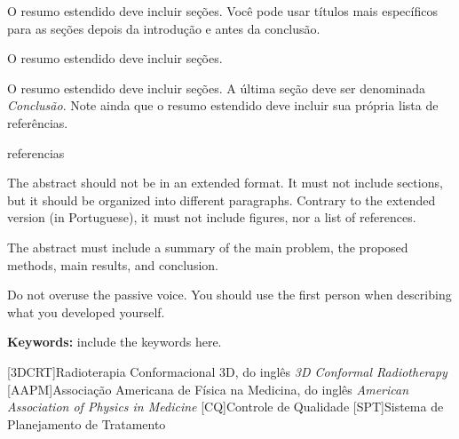 \documentclass[a4paper, 12pt]{ppgeb}
\begin{document}
O resumo estendido deve incluir seções. Você pode usar títulos mais específicos para as seções depois da introdução e antes da conclusão.

O resumo estendido deve incluir seções.

O resumo estendido deve incluir seções. A última seção deve ser denominada \emph{Conclusão}. Note ainda que o resumo estendido deve incluir sua própria lista de referências.

{\let\clearpage\relax
{referencias}{}
}
\acresetall %
\clearpage
\restoregeometry
\acresetall %
\vspace{24pt}

The abstract should not be in an extended format. It must not include sections, but it should be organized into different paragraphs. Contrary to the extended version (in Portuguese), it must not include figures, nor a list of references.

The abstract must include a summary of the main problem, the proposed methods, main results, and conclusion.

Do not overuse the passive voice. You should use the first person when describing what you developed yourself.

\vspace{14pt}

\noindent\textbf{Keywords: }include the keywords here.


\acresetall %

\indice

\begin{center}

{\bfseries{} }%
\end{center}

[3DCRT]{Radioterapia Conformacional 3D, do inglês \emph{3D Conformal Radiotherapy}}
[AAPM]{Associação Americana de Física na Medicina, do inglês \emph{American Association of Physics in Medicine}}
[CQ]{Controle de Qualidade}
[SPT]{Sistema de Planejamento de Tratamento}
\end{document}
